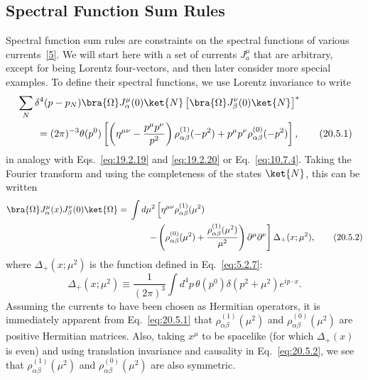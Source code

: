 
\subsection{Spectral Function Sum Rules}

Spectral function sum rules are constraints on the spectral functions of various currents~\hyperref[ch20-ref-5]{[5]}. We will start here with a set of currents $J_a^\mu$ that are arbitrary, except for being Lorentz four-vectors, and then later consider more special examples. To define their spectral functions, we use Lorentz invariance to write
\begin{align}
&\sum_N\delta^4(p-p_N)
\bra{\Omega}J_\alpha^\mu(0)\ket{N}
\left[\bra{\Omega}J_\beta^\nu(0)\ket{N}\right]^*
\notag\\
&\qquad=(2\pi)^{-3}\theta(p^0)
\left[
\left(\eta^{\mu\nu}-\frac{p^\mu p^\nu}{p^2}\right)
\rho_{\alpha\beta}^{(1)}(-p^2)
+p^\mu p^\nu\rho_{\alpha\beta}^{(0)}(-p^2)
\right],
\tag{20.5.1}\label{eq:20.5.1}
\end{align}
in analogy with Eqs.~\eqref{eq:19.2.19} and \eqref{eq:19.2.20} or Eq.~\eqref{eq:10.7.4}. Taking the Fourier transform and using the completeness of the states $\ket{N}$, this can be written
\begin{align}
\bra{\Omega}J_\alpha^\mu(x)J_\beta^\nu(0)\ket{\Omega}
={}&\int d\mu^2
\left[
\eta^{\mu\nu}\rho_{\alpha\beta}^{(1)}(\mu^2)
\right.
\notag\\
&\left.
\qquad-
\left(
\rho_{\alpha\beta}^{(0)}(\mu^2)
+\frac{\rho_{\alpha\beta}^{(1)}(\mu^2)}{\mu^2}
\right)
\partial^\mu\partial^\nu
\right]\Delta_+(x;\mu^2),
\tag{20.5.2}\label{eq:20.5.2}
\end{align}
where $\Delta_+(x;\mu^2)$ is the function defined in Eq.~\eqref{eq:5.2.7}:
\begin{equation}
\Delta_+(x;\mu^2)\equiv
\frac{1}{(2\pi)^3}
\int d^4p\,\theta(p^0)\delta(p^2+\mu^2)e^{ip\cdot x}.
\tag{20.5.3}\label{eq:20.5.3}
\end{equation}
Assuming the currents to have been chosen as Hermitian operators, it is immediately apparent from Eq.~\eqref{eq:20.5.1} that $\rho_{\alpha\beta}^{(1)}(\mu^2)$ and $\rho_{\alpha\beta}^{(0)}(\mu^2)$ are positive Hermitian matrices. Also, taking $x^\mu$ to be spacelike (for which $\Delta_+(x)$ is even) and using translation invariance and causality in Eq.~\eqref{eq:20.5.2}, we see that $\rho_{\alpha\beta}^{(1)}(\mu^2)$ and $\rho_{\alpha\beta}^{(0)}(\mu^2)$ are also symmetric.

